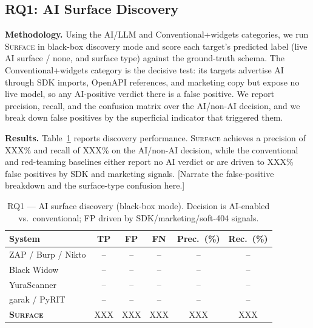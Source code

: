 \subsection{RQ1: AI Surface Discovery}
\label{sec:eval:rq1}

\textbf{Methodology.} Using the AI/LLM and Conventional+widgets categories, we
run \textsc{Surface} in black-box discovery mode and score each target's
predicted label (live AI surface / none, and surface type) against the
ground-truth schema. The Conventional+widgets category is the decisive test:
its targets advertise AI through SDK imports, OpenAPI references, and marketing
copy but expose no live model, so any AI-positive verdict there is a false
positive. We report precision, recall, and the confusion matrix over the
AI/non-AI decision, and we break down false positives by the superficial
indicator that triggered them.

\textbf{Results.} Table~\ref{tab:rq1} reports discovery performance.
\textsc{Surface} achieves a precision of \textsc{XXX}\% and recall of
\textsc{XXX}\% on the AI/non-AI decision, while the conventional and
red-teaming baselines either report no AI verdict or are driven to
\textsc{XXX}\% false positives by SDK and marketing signals. [Narrate the
false-positive breakdown and the surface-type confusion here.]

\begin{table}[t]
\centering
\caption{RQ1 --- AI surface discovery (black-box mode). Decision is
AI-enabled vs.\ conventional; FP driven by SDK/marketing/soft-404 signals.}
\label{tab:rq1}
\small
\begin{tabular}{@{}lccccc@{}}
\toprule
\textbf{System} & \textbf{TP} & \textbf{FP} & \textbf{FN} &
\textbf{Prec.\ (\%)} & \textbf{Rec.\ (\%)} \\
\midrule
ZAP / Burp / Nikto   & -- & -- & -- & -- & -- \\
Black Widow          & -- & -- & -- & -- & -- \\
YuraScanner          & -- & -- & -- & -- & -- \\
garak / PyRIT        & -- & -- & -- & -- & -- \\
\textbf{\textsc{Surface}} & \textsc{XXX} & \textsc{XXX} & \textsc{XXX} & \textsc{XXX} & \textsc{XXX} \\
\bottomrule
\end{tabular}
\end{table}

